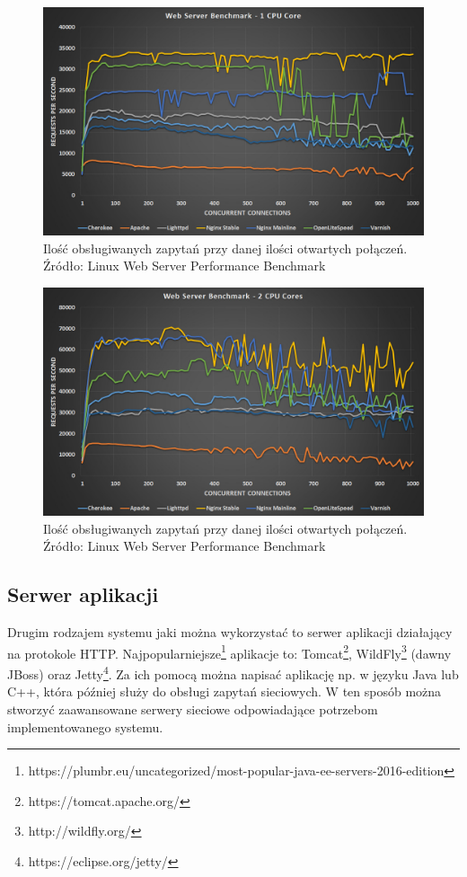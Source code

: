 \documentclass{report}
\begin{document}
			\begin{center}
				\begin{figure}[ht]
					\centering
					\includegraphics[scale=0.35]{web-server-performance-benchmark-1-cpu-core-1.jpg}
					\caption{Ilość obsługiwanych zapytań przy danej ilości otwartych połączeń. Źródło: Linux Web Server Performance Benchmark}
				\end{figure}
			\end{center}

			\begin{center}
				\begin{figure}[ht]
					\centering
					\includegraphics[scale=0.35]{web-server-performance-benchmark-2-cpu-cores-2.jpg}
					\caption{Ilość obsługiwanych zapytań przy danej ilości otwartych połączeń. Źródło: Linux Web Server Performance Benchmark}
				\end{figure}
			\end{center}
		
			\subsection{Serwer aplikacji}
			Drugim rodzajem systemu jaki można wykorzystać to serwer aplikacji działający na protokole HTTP. Najpopularniejsze\footnote{https://plumbr.eu/uncategorized/most-popular-java-ee-servers-2016-edition} aplikacje to: Tomcat\footnote{https://tomcat.apache.org/}, WildFly\footnote{http://wildfly.org/} (dawny JBoss) oraz Jetty\footnote{https://eclipse.org/jetty/}. Za ich pomocą można napisać aplikację np. w języku Java lub C++, która później służy do obsługi zapytań sieciowych. W ten sposób można stworzyć zaawansowane serwery sieciowe odpowiadające potrzebom implementowanego systemu.
		
\end{document}

